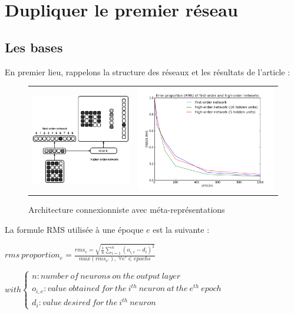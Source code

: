 \documentclass[a4paper,12pt, twoside]{article}
\begin{document}
\section{Dupliquer le premier réseau}

\subsection{Les bases}

En premier lieu, rappelons la structure des réseaux et les résultats de l'article :
\begin{figure}[H]
\begin{center}
\begin{tabular}{cc}
 \includegraphics[width=190px]{../cleeremans_2007/digit_reco/digit_reco.png} &
 \includegraphics[width=270px]{../cleeremans_2007/digit_reco/rms.png}
\end{tabular}
\end{center}
\caption{ \cite{Cleeremans_2007} Architecture connexionniste avec méta-représentations  }
\end{figure}

La formule RMS utilisée à une époque $e$ est la suivante :
\begin{center}
\begin{large}
$ rms\ proportion_{e} = \frac{ rms_{e} = \sqrt{ \frac{1}{n} \sum \limits_{i=1}^{n} ( o_{i,e} - d_{i} )^2 }}{max(rms_{e'}),\ \forall e' \in epochs } $
\end{large}
$ with \left\lbrace \begin{array}{lll} n : number\ of\ neurons\ on\ the\ output\ layer\\o_{i,e} : value\ obtained\ for\ the\ i^{th}\ neuron\ at\ the\ e^{th}\ epoch\\d_{i} : value\ desired \ for\ the\ i^{th}\ neuron\end{array} \right.$
\end{center}
\end{document}
